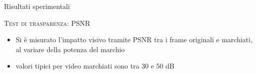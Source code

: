 \documentclass{beamer}
\begin{document}
\begin{section}{Risultati sperimentali}
\begin{frame}[t]{\textsc{Test di trasparenza: PSNR}}
\begin{block}{}
\begin{itemize}
\item Si \`{e} misurato l'impatto visivo tramite PSNR tra i frame originali e marchiati, al variare della potenza del marchio
\item valori tipici per video marchiati sono tra 30 e 50 dB
\end{itemize}
\end{block}
\vspace{4mm}
\begin{table}

\end{table}
\end{frame}

\end{section}
\end{document}
